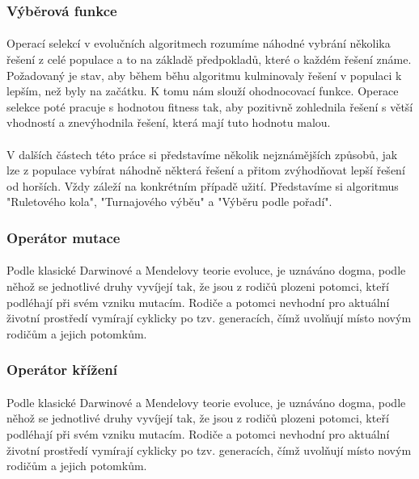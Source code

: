 \documentclass[bc,male,java,dept460]{diploma}		%
\begin{document}
\subsubsection{Výběrová funkce}
\paragraph*{}
Operací selekcí v evolučních algoritmech rozumíme náhodné vybrání několika řešení z celé populace a to na základě předpokladů, které o každém řešení známe. Požadovaný je stav, aby během běhu algoritmu kulminovaly řešení v populaci k lepším, než byly na začátku. K tomu nám slouží ohodnocovací funkce. Operace selekce poté pracuje s hodnotou fitness tak, aby pozitivně zohlednila řešení s větší vhodností a znevýhodnila řešení, která mají tuto hodnotu malou.

\paragraph*{}
V dalších částech této práce si představíme několik nejznámějších způsobů, jak lze z populace vybírat náhodně některá řešení a přitom zvýhodňovat lepší řešení od horších. Vždy záleží na konkrétním případě užití. Představíme si algoritmus "Ruletového kola", "Turnajového výběu" a "Výběru podle pořadí".

\subsubsection{Operátor mutace}
\paragraph*{}
Podle klasické Darwinové a Mendelovy teorie evoluce, je uznáváno dogma, podle něhož se jednotlivé druhy vyvíjejí tak, že jsou z rodičů plozeni potomci, kteří podléhají při svém vzniku mutacím. Rodiče a potomci nevhodní pro aktuální životní prostředí vymírají cyklicky po tzv. generacích, čímž uvolňují místo novým rodičům a jejich potomkům.

\subsubsection{Operátor křížení}
\paragraph*{}
Podle klasické Darwinové a Mendelovy teorie evoluce, je uznáváno dogma, podle něhož se jednotlivé druhy vyvíjejí tak, že jsou z rodičů plozeni potomci, kteří podléhají při svém vzniku mutacím. Rodiče a potomci nevhodní pro aktuální životní prostředí vymírají cyklicky po tzv. generacích, čímž uvolňují místo novým rodičům a jejich potomkům.
\end{document}
